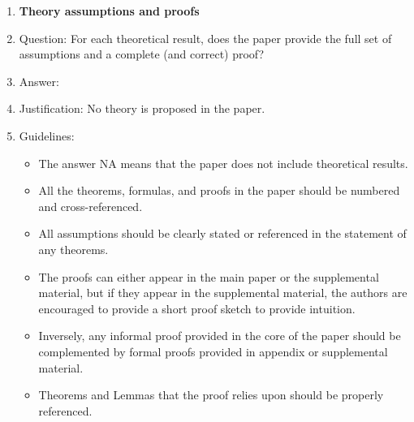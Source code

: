 \documentclass{article}
\begin{document}
\begin{enumerate}
\item {\bf Theory assumptions and proofs}
    \item[] Question: For each theoretical result, does the paper provide the full set of assumptions and a complete (and correct) proof?
    \item[] Answer: \answerNA %
    \item[] Justification: No theory is proposed in the paper.
    \item[] Guidelines:
    \begin{itemize}
        \item The answer NA means that the paper does not include theoretical results. 
        \item All the theorems, formulas, and proofs in the paper should be numbered and cross-referenced.
        \item All assumptions should be clearly stated or referenced in the statement of any theorems.
        \item The proofs can either appear in the main paper or the supplemental material, but if they appear in the supplemental material, the authors are encouraged to provide a short proof sketch to provide intuition. 
        \item Inversely, any informal proof provided in the core of the paper should be complemented by formal proofs provided in appendix or supplemental material.
        \item Theorems and Lemmas that the proof relies upon should be properly referenced. 
    \end{itemize}


\end{enumerate}
\end{document}
